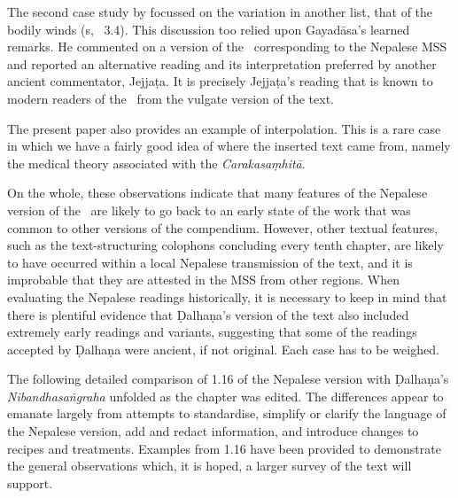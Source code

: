 The second case study by \citet{kleb-2021b} focussed on the variation in another
list, that of the bodily winds (s, \SS\ 3.4).
This  discussion  too relied upon Gayadāsa's learned remarks. 
He commented on a version of the \SS\ corresponding to the Nepalese MSS 
and reported an alternative reading and its interpretation preferred
by another ancient commentator, Jejjaṭa.  It is precisely 
Jejjaṭa's reading that is known to modern
readers of the \SS\ from the vulgate version of the text. 

The present paper also provides an example of
interpolation.  This is a rare case in which we have a fairly good idea of where
the inserted text came from, namely the medical theory associated with the
\emph{Carakasaṃhitā}.


On the whole, these observations indicate that many features of the Nepalese version of the 
\SS\ are likely to go back to an early state of the work that was common to other versions of 
the compendium. 
However, other textual features, such as the text-structuring colophons concluding every 
tenth chapter, are likely to have occurred within a local Nepalese transmission of the text, 
and it is improbable that they are attested in the MSS from other regions. 
When evaluating the Nepalese readings historically, it is necessary to keep in mind that there 
is plentiful evidence that Ḍalhaṇa's version of the text also included extremely early 
readings and variants, suggesting that some of the readings accepted by Ḍalhaṇa were 
ancient, if not original.  Each case has to be weighed. 


The following detailed comparison of 1.16 of the Nepalese version with Ḍalhaṇa's 
\emph{Nibandhasaṅgraha} unfolded as the chapter was edited. The differences appear to 
emanate largely from attempts to standardise, simplify or clarify the language of the 
Nepalese version, add and redact information, and introduce changes to recipes and 
treatments. Examples from 1.16 have been provided to demonstrate the general 
observations which, it is hoped, a larger survey of the text will support.

